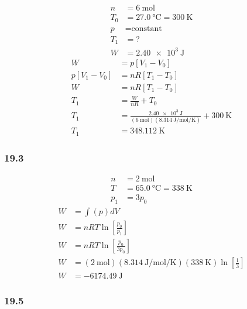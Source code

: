 \documentclass{article}
\begin{document}
\begin{align*}
	n & = \SI{6}{\mole} \\
	T_0 & = \SI{27.0}{\celsius} = \SI{300}{\kelvin} \\
	p & = \text{constant} \\
	T_1 & = ? \\
	W & = \SI{2.40e3}{\joule}
\end{align*}
\begin{align*}
	W & = p \left[ V_1 - V_0 \right] \\
	p \left[ V_1 - V_0 \right] & = nR \left[ T_1 - T_0 \right] \\
	W & = nR \left[ T_1 - T_0 \right] \\
	T_1 & = \frac{ W }{ nR } + T_0 \\
	T_1 & = \frac{ \SI{2.40e3}{\joule} }{ (\SI{6}{\mole})(\SI{8.314}{\joule \per \mole \per \kelvin}) } + \SI{300}{\kelvin} \\
	T_1 & = \SI{348.112}{\kelvin}
\end{align*}

\subsubsection{19.3}

\begin{align*}
	n & = \SI{2}{\mole} \\
	T & = \SI{65.0}{\celsius} = \SI{338}{\kelvin} \\
	p_1 & = 3p_0
\end{align*}
\begin{align*}
	W & = \int (p) dV \\
	W & = nRT \ln \left[ \frac{ p_0 }{ p_1 } \right] \\
	W & = nRT \ln \left[ \frac{ p_0 }{ 3p_0 } \right] \\
	W & = (\SI{2}{\mole})(\SI{8.314}{\joule \per \mole \per \kelvin})(\SI{338}{\kelvin}) \ln \left[ \frac{ 1 }{ 3 } \right] \\
	W & = \SI{-6174.49}{\joule}
\end{align*}

\subsubsection{19.5}
\end{document}
